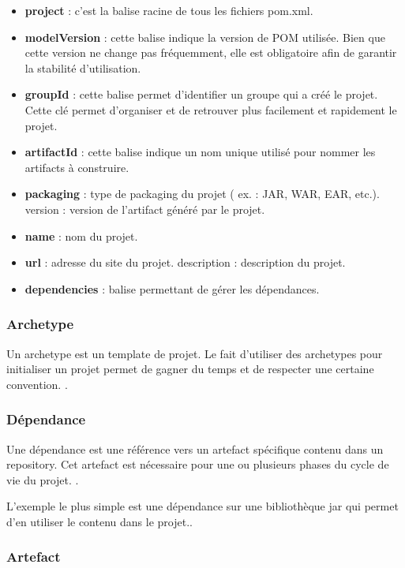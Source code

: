 \begin{itemize}

\item \textbf{project} : c'est la balise racine de tous les fichiers pom.xml.
\item \textbf{modelVersion} : cette balise indique la version de POM utilisée. Bien que cette version ne change pas fréquemment, elle est obligatoire afin de garantir la stabilité d'utilisation.
\item \textbf{groupId} : cette balise permet d'identifier un groupe qui a créé le projet. Cette clé permet d'organiser et de retrouver plus facilement et rapidement le projet.
\item \textbf{artifactId} : cette balise indique un nom unique utilisé pour nommer les artifacts à construire.
\item \textbf{packaging} : type de packaging du projet ( ex. : JAR, WAR, EAR, etc.).
version : version de l'artifact généré par le projet.
\item \textbf{name} : nom du projet.
\item \textbf{url} : adresse du site du projet.
description : description du projet.
\item \textbf{dependencies} : balise permettant de gérer les dépendances.
\end{itemize}

\subsubsection{Archetype }
Un archetype est un template de projet. Le fait d'utiliser des archetypes pour initialiser un projet permet de gagner du temps et de respecter une certaine convention. \cite{maven}.

\subsubsection{Dépendance  }
 Une dépendance est une référence vers un artefact spécifique contenu dans un repository. Cet artefact est nécessaire pour une ou plusieurs phases du cycle de vie du projet. \cite{maven}.
 
 L'exemple le plus simple est une dépendance sur une bibliothèque jar qui permet d'en utiliser le contenu dans le projet.\parencite{maven}.
 
 \subsubsection{Artefact }
 
